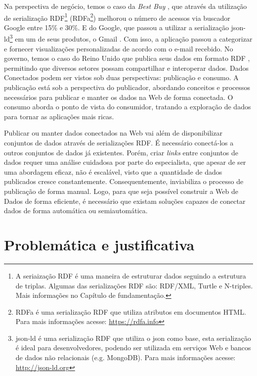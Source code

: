 Na perspectiva de negócio, temos o caso da \textit{Best Buy} \cite{brinker2009best}, que através da utilização de serialização RDF\footnote{A seriaização RDF é uma maneira de estruturar dados seguindo a estrutura de triplas. Algumas das serializações RDF são: RDF/XML, Turtle e N-triples. Mais informações no Capítulo de fundamentação.} (RDFa\footnote{RDFa é uma serialização RDF que utiliza atributos em documentos HTML. Para mais informações acesse: \url{https://rdfa.info}}) melhorou o número de acessos via buscador  Google entre 15\% e 30\%. E do Google, que passou a utilizar a serialização json-ld\footnote{json-ld é uma serialização RDF que utiliza o json como base, esta serialização é ideal para desenvolvedores, podendo ser utilizada em serviços Web e bancos de dados não relacionais (e.g. MongoDB). Para mais informações acesse: \url{http://json-ld.org}} em um de seus produtos, o Gmail \cite{simister2013simple}. Com isso, a aplicação passou a categorizar e fornecer visualizações personalizadas de acordo com o e-mail recebido. No governo, temos o caso do Reino Unido que publica seus dados em formato RDF \cite{shadbolt2012linked}, permitindo que diversos setores possam compartilhar e interoperar dados.
Dados Conectados podem ser vistos sob duas perspectivas: publicação e consumo. A publicação está sob a perspectiva do publicador, abordando conceitos \cite{berners2006linked, wood2014linked} e processos \cite{bizer2007publish, hyland2011joy, villazon2011methodological, Avila2015} necessários para publicar e manter os dados na Web de forma conectada. O consumo aborda o ponto de vista do consumidor, tratando a exploração de dados para tornar as aplicações mais ricas. 

Publicar ou manter dados conectados na Web vai além de disponibilizar conjuntos de dados através de serializações RDF. É necessário conectá-los a outros conjuntos de dados já existentes. Porém, criar \textit{links} entre conjuntos de dados requer uma análise cuidadosa por parte do especialista, que apesar de ser uma abordagem eficaz, não é escalável, visto que a quantidade de dados publicados cresce constantemente. Consequentemente, inviabiliza o processo de publicação de forma manual. Logo, para que seja possível construir a Web de Dados de forma eficiente, é necessário que existam soluções capazes de conectar dados de forma automática ou semiautomática.

\section{Problemática e justificativa}

